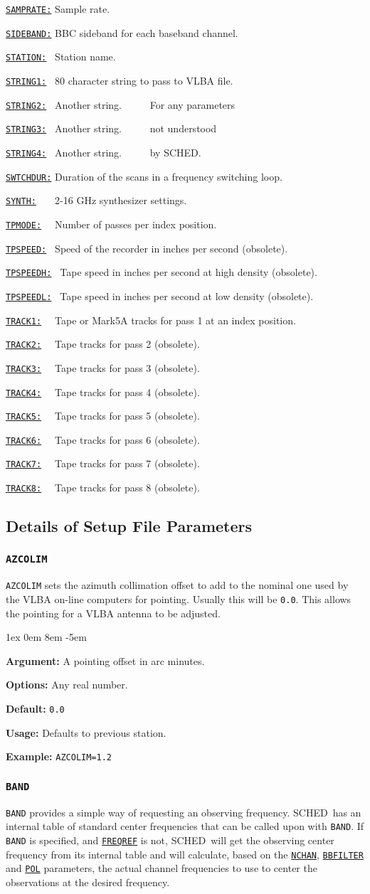 \documentclass{report}
\newcommand{\sched}{{\sc SCHED}}
\newcommand{\schedb}{{\sc SCHED~}}
\newcommand{\rcwbox}[5]{
  \begin{list}{}{\parsep 1ex  \itemsep 0em
                 \leftmargin 8em  \itemindent -5em }
    \item {\bf Argument:} #1
    \item {\bf Options:}  #2
    \item {\bf Default:}  #3
    \item {\bf Usage:}    #4
    \item {\bf Example:}  #5
  \end{list}
}
\newcommand{\htls}[2]%
{\item
  \hyperref[SP:#1]{{\tt #1:}}{\tt #2}%
}
\newcommand{\htlt}[3]%
{\item
  \hyperref[SP:#2]{{\tt #1:}}{\tt #3}%
}
\begin{document}
\begin{list}{~}{\parsep 0em  \itemsep 0em }
\htls{SAMPRATE}{} Sample rate.
\htls{SIDEBAND}{} BBC sideband for each baseband channel.
\htls{STATION}{~} Station name.
\htls{STRING1}{~} 80 character string to pass to VLBA file.
\htlt{STRING2}{STRING1}{~} Another string. ~~~~~For any parameters
\htlt{STRING3}{STRING1}{~} Another string. ~~~~~not understood
\htlt{STRING4}{STRING1}{~} Another string. ~~~~~by \sched.
\htls{SWTCHDUR}{} Duration of the scans in a frequency switching loop.
\htls{SYNTH}{~~~} 2-16 GHz synthesizer settings.
\htls{TPMODE}{~~} Number of passes per index position.
\htls{TPSPEED}{~} Speed of the recorder in inches per second (obsolete).
\htls{TPSPEEDH}{~} Tape speed in inches per second at high density (obsolete).
\htls{TPSPEEDL}{~} Tape speed in inches per second at low density (obsolete).
\htls{TRACK1}{~~} Tape or Mark5A tracks for pass 1 at an index position.
\htlt{TRACK2}{TRACK1}{~~} Tape tracks for pass 2 (obsolete).
\htlt{TRACK3}{TRACK1}{~~} Tape tracks for pass 3 (obsolete).
\htlt{TRACK4}{TRACK1}{~~} Tape tracks for pass 4 (obsolete).
\htlt{TRACK5}{TRACK1}{~~} Tape tracks for pass 5 (obsolete).
\htlt{TRACK6}{TRACK1}{~~} Tape tracks for pass 6 (obsolete).
\htlt{TRACK7}{TRACK1}{~~} Tape tracks for pass 7 (obsolete).
\htlt{TRACK8}{TRACK1}{~~} Tape tracks for pass 8 (obsolete).
\end{list}




\subsection{\label{SSEC:SETDET}Details of Setup File Parameters}

\subsubsection{\label{SP:AZCOLIM}{\tt AZCOLIM}}

{\tt AZCOLIM} sets the azimuth collimation offset to add to the nominal
one used by the VLBA on-line computers for pointing. Usually this will
be {\tt 0.0}.  This allows the pointing for a VLBA antenna to be
adjusted.

\rcwbox
{A pointing offset in arc minutes.}
{Any real number.}
{{\tt 0.0}}
{Defaults to previous station.}
{{\tt AZCOLIM=1.2}}


\subsubsection{\label{SP:BAND}{\tt BAND}}

{\tt BAND} provides a simple way of requesting an observing frequency.
\schedb has an internal table of standard center frequencies that can
be called upon with {\tt BAND}.  If {\tt BAND} is specified, and
{\hyperref[SP:FREQREF]{{\tt FREQREF}}} is not, \schedb will get the
observing center frequency from its internal table and will calculate,
based on the 
{\hyperref[SP:NCHAN]{{\tt NCHAN}}}, 
{\hyperref[SP:BBFILTER]{{\tt BBFILTER}}} and 
{\hyperref[SP:POL]{{\tt POL}}} parameters,
the actual channel frequencies to use to center the observations at
the desired frequency.
\end{document}
